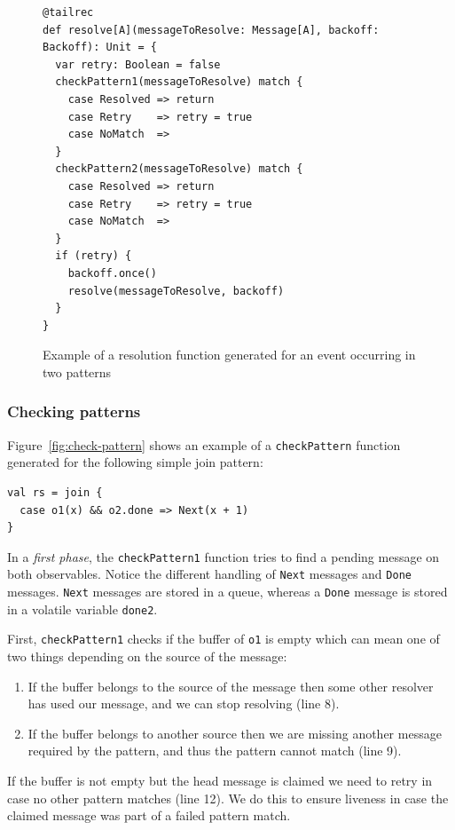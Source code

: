 \documentclass[runningheads]{llncs}
\begin{document}
\begin{sloppypar}
\begin{figure}[ht]
\centering
\lstset{numbers=left}
\begin{lstlisting}[escapechar=!]
@tailrec
def resolve[A](messageToResolve: Message[A], backoff: Backoff): Unit = {
  var retry: Boolean = false
  checkPattern1(messageToResolve) match {
    case Resolved => return
    case Retry    => retry = true
    case NoMatch  =>
  }
  checkPattern2(messageToResolve) match {
    case Resolved => return
    case Retry    => retry = true
    case NoMatch  =>
  }
  if (retry) {
    backoff.once()
    resolve(messageToResolve, backoff)
  }
}
\end{lstlisting}
\caption{Example of a resolution function generated for an event occurring in two patterns}
\label{fig:resolve}
\end{figure}


\subsubsection{Checking patterns}

Figure~\ref{fig:check-pattern} shows an example of a \verb|checkPattern|
function generated for the following simple join pattern:

\begin{lstlisting}
val rs = join {
  case o1(x) && o2.done => Next(x + 1)
}
\end{lstlisting}
\noindent
In a {\em first phase}, the \verb|checkPattern1| function tries to find a
pending message on both observables. Notice the different handling of
\texttt{Next} messages and \texttt{Done} messages. \texttt{Next} messages are
stored in a queue, whereas a \texttt{Done} message is stored in a volatile
variable \texttt{done2}.

First, \verb|checkPattern1| checks if the buffer of \verb|o1| is empty which
can mean one of two things depending on the source of the message:

\begin{enumerate}
\item If the buffer belongs to the source of the message then some other
      resolver has used our message, and we can stop resolving (line 8).
\item If the buffer belongs to another source then we are missing another
      message required by the pattern, and thus the pattern cannot match
      (line 9).
\end{enumerate}
\noindent
If the buffer is not empty but the head message is claimed we need to retry in
case no other pattern matches (line 12). We do this to ensure liveness in case
the claimed message was part of a failed pattern match.


\end{sloppypar}
\end{document}
